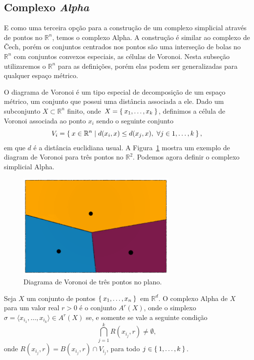 \subsection{Complexo \textit{Alpha}}
E como uma terceira opção para a construção de um complexo simplicial através
de pontos no $\mathbb{R}^n$, temos o complexo Alpha. A construção é similar
ao complexo de \v{C}ech, porém os conjuntos centrados nos pontos são uma
interseção de bolas no $\mathbb{R}^n$ com conjuntos convexos especiais,
as células de Voronoi. Nesta subseção utilizaremos o $\mathbb{R}^n$ para as definições, porém elas podem ser generalizadas para qualquer espaço métrico.

O diagrama de Voronoi é um tipo especial de decomposição de um espaço métrico,
um conjunto que possui uma distância associada a ele.
Dado um subconjunto $X \subset \mathbb{R}^n$ finito, onde $X=\Set{x_1, \dots, x_k}$,
definimos a célula de Voronoi associada ao ponto $x_i$ sendo o seguinte conjunto
\begin{equation*}
  V_i = \Set{x\in \mathbb{R}^n | d(x_i, x) \leq d(x_j, x), \ \forall j \in {1,\dots,k}},
\end{equation*}
em que $d$ é a distância euclidiana usual. A Figura~\ref{fig:vor_ex} mostra um
exemplo de diagram de Voronoi para três pontos no $\mathbb{R}^2$. Podemos agora
definir o complexo simplicial Alpha.

\begin{figure}[!htpb]
  \centering
  \includegraphics[width=0.7\textwidth]{images/voronoi_diagram.png}
  \caption{Diagrama de Voronoi de três pontos no plano.}
  \label{fig:vor_ex}
  \fautor
\end{figure}

\begin{defi}
  Seja $X$ um conjunto de pontos $\Set{x_1, \dots, x_n}$ em $\mathbb{R}^d$. O complexo
  Alpha de $X$ para um valor real $r>0$ é o conjunto $A^r(X)$, onde o simplexo
  $\sigma = \langle x_{i_1}, \dots, x_{i_k} \rangle \in A^r(X)$ se, e somente se vale a seguinte
  condição
  \begin{equation*}
    \bigcap_{j=1}^k R(x_{i_j},r) \neq \emptyset,
  \end{equation*}
  onde $R(x_{i_j},r) = B(x_{i_j}, r) \cap V_{i_j}$, para todo $j \in \Set{1,\dots,k}$.
\end{defi}

